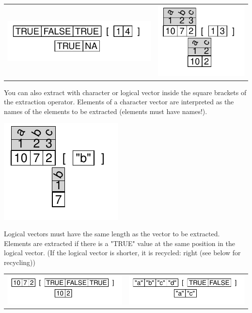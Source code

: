 \documentclass[pdflatex]{article}
\begin{document}
\begin{tabular}{cc}
\includegraphics{extract_nums_outsider} & \includegraphics{extract_nums_names}
\end{tabular}

You can also extract with character or logical vector inside the square brackets of the extraction operator. Elements of a character vector are interpreted as the names of the elements to be extracted (elements must have names!).

\includegraphics{extract_char_names}

Logical vectors must have the same length as the vector to be extracted. Elements are extracted if there is a "TRUE" value at the same position in the logical vector. (If the logical vector is shorter, it is recycled: right (see below for recycling))

\begin{tabular}{ll}
\includegraphics{extract_logical} & \includegraphics{extract_logical_recycling}\\
\end{tabular}
\end{document}
